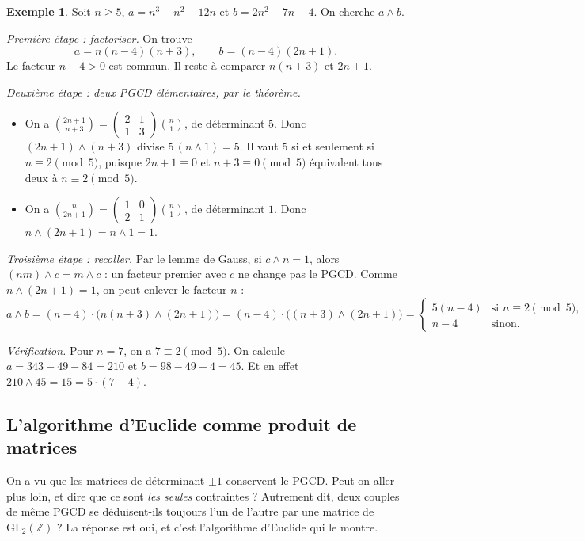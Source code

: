 \documentclass[11pt,a4paper]{article}
\theoremstyle{plain}
\theoremstyle{definition}
\newtheorem{exemple}[theoreme]{Exemple}
\theoremstyle{remark}
\newcommand{\Z}{\mathbb{Z}}
\newcommand{\GL}{\mathrm{GL}}
\newcommand{\pgcd}{\wedge}
\begin{document}
\begin{exemple}\label{ex:pgcd-n}
Soit $n\geq5$, $a=n^3-n^2-12n$ et $b=2n^2-7n-4$. On cherche $a\pgcd b$.

\emph{Première étape : factoriser.} On trouve
\[
  a=n(n-4)(n+3), \qquad b=(n-4)(2n+1).
\]
Le facteur $n-4>0$ est commun. Il reste à comparer $n(n+3)$ et $2n+1$.

\emph{Deuxième étape : deux PGCD élémentaires, par le théorème.}
\begin{itemize}[nosep]
\item On a $\binom{2n+1}{n+3}=\begin{pmatrix}2&1\\1&3\end{pmatrix}\binom{n}{1}$, de déterminant $5$. Donc $(2n+1)\pgcd(n+3)$ divise $5\,(n\pgcd 1)=5$. Il vaut $5$ si et seulement si $n\equiv2\pmod5$, puisque $2n+1\equiv0$ et $n+3\equiv0\pmod 5$ équivalent tous deux à $n\equiv2\pmod5$.
\item On a $\binom{n}{2n+1}=\begin{pmatrix}1&0\\2&1\end{pmatrix}\binom{n}{1}$, de déterminant $1$. Donc $n\pgcd(2n+1)=n\pgcd1=1$.
\end{itemize}

\emph{Troisième étape : recoller.} Par le lemme de Gauss, si $c\pgcd n=1$, alors $(nm)\pgcd c=m\pgcd c$ : un facteur premier avec $c$ ne change pas le PGCD. Comme $n\pgcd(2n+1)=1$, on peut enlever le facteur $n$ :
\[
  a\pgcd b=(n-4)\cdot\big(n(n+3)\pgcd(2n+1)\big)=(n-4)\cdot\big((n+3)\pgcd(2n+1)\big)
  =\begin{cases} 5(n-4) & \text{si } n\equiv 2 \pmod 5,\\ n-4 & \text{sinon.}\end{cases}
\]

\emph{Vérification.} Pour $n=7$, on a $7\equiv2\pmod5$. On calcule $a=343-49-84=210$ et $b=98-49-4=45$. Et en effet $210\pgcd45=15=5\cdot(7-4)$.
\end{exemple}

\subsection{L'algorithme d'Euclide comme produit de matrices}

On a vu que les matrices de déterminant $\pm1$ conservent le PGCD. Peut-on aller plus loin, et dire que ce sont \emph{les seules} contraintes ? Autrement dit, deux couples de même PGCD se déduisent-ils toujours l'un de l'autre par une matrice de $\GL_2(\Z)$ ? La réponse est oui, et c'est l'algorithme d'Euclide qui le montre.
\end{document}
